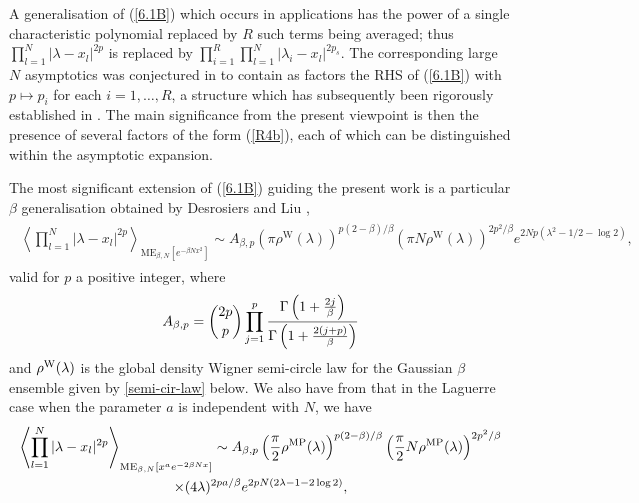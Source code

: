 \documentclass[11pt,a4paper]{article}
\numberwithin{equation}{section} %
\theoremstyle{plain}
\theoremstyle{definition}
\numberwithin{prop}{section}
\numberwithin{cor}{section}
\numberwithin{remark}{section}
\begin{document}
 A generalisation of (\ref{6.1B}) which occurs in applications \cite{FFGW03} has the
 power of a single characteristic polynomial replaced by $R$ such terms being averaged;
 thus $\prod_{l=1}^{N} |\lambda - x_l|^{2p}$ is replaced by $\prod_{i=1}^R\prod_{l=1}^{N} |\lambda_i - x_l|^{2p_s}$. The corresponding large $N$ asymptotics was conjectured in
 \cite{FF04} to contain as factors the RHS of (\ref{6.1B}) with $p \mapsto p_i$ for each
 $i=1,\dots,R$, a structure which has subsequently been rigorously established in
 \cite{Ga05,Kr07,Ch19}. The  main significance from the present viewpoint is then the presence of several factors of the form (\ref{R4b}), each of which can be distinguished within the asymptotic expansion.

 The most significant extension of (\ref{6.1B})  guiding the present work is a particular $\beta$ generalisation obtained by Desrosiers and Liu \cite[Gaussian case of Th.~1.2 with $m=p$, $u = \lambda$, $s_1 = \cdots = s_{2p} =0$, and a scaling of the variables $x_l \mapsto \sqrt{2N} x_l$ in the multiple integrals corresponding to $\phi_N(\sqrt{2N}u,\dots,\sqrt{2N}u)$]{DL14},
 \begin{align}\label{asy-Gau}
            \begin{aligned}
			 \left\langle\prod_{l=1}^N |\lambda-x_l|^{2 p}\right\rangle_{\mathrm{ME}_{\beta, N}\left[e^{-\beta N x^2}\right]} 
			\sim A_{\beta, p}\left(\pi \rho^{\mathrm{W}}(\lambda)\right)^{p(2-\beta) / \beta}\left(\pi N \rho^{\mathrm{W}}(\lambda)\right)^{2 p^2 / \beta} e^{2 N p\left(\lambda^2-1 / 2-\log 2\right)},
		\end{aligned}
        \end{align}
        valid for $p$ a positive integer, where
        \begin{align}\label{A-the-const}
		A_{\beta, p}=\binom{2p}{p}\prod_{j=1}^{p}{\Gamma\left(1+{2j\over\beta}\right)\over\Gamma\left(1+{2(j+p)\over\beta}\right)} 
    \end{align}
 and $\rho^{\rm W}(\lambda)$ is the global density Wigner semi-circle law for the Gaussian $\beta$ ensemble given by \eqref{semi-cir-law} below.
 We also have from \cite[Th.~1.2]{DL14} that in the Laguerre case when the parameter $a$ is independent with $N$, we have
        \begin{multline}\label{asy-Lag}
			\left\langle\prod_{l=1}^N |\lambda-x_l|^{2 p}\right\rangle_{\mathrm{ME}_{\beta, N}\left[x^{a}e^{-2\beta N x}\right]} \sim A_{\beta, p}\left({\pi\over 2} \rho^{\mathrm{MP}}(\lambda)\right)^{p(2-\beta) / \beta}\left({\pi \over 2}N \rho^{\mathrm{MP}}(\lambda)\right)^{2 p^2 / \beta} \\
			\times(4\lambda)^{2pa/\beta}e^{2 pN \left(2\lambda-1 -2\log 2\right)},
		\end{multline}
\end{document}
